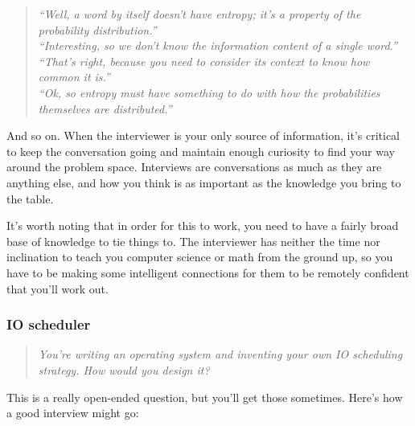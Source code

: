 \documentclass{article}
\begin{document}
\begin{quote}
\em
``Well, a word by itself doesn't have entropy; it's a property of the
  probability distribution.'' \\
``Interesting, so we don't know the information content of a single
  word.'' \\
``That's right, because you need to consider its context to know how
  common it is.'' \\
``Ok, so entropy must have something to do with how the probabilities
  themselves are distributed.''
\end{quote}

    And so on. When the interviewer is your only source of information, it's
    critical to keep the conversation going and maintain enough curiosity to
    find your way around the problem space. Interviews are conversations as
    much as they are anything else, and how you think is as important as the
    knowledge you bring to the table.

    It's worth noting that in order for this to work, you need to have a fairly
    broad base of knowledge to tie things to. The interviewer has neither the
    time nor inclination to teach you computer science or math from the ground
    up, so you have to be making some intelligent connections for them to be
    remotely confident that you'll work out.

\subsubsection{IO scheduler}
\begin{quote}
\em
You're writing an operating system and inventing your own IO scheduling
strategy. How would you design it?
\end{quote}

      This is a really open-ended question, but you'll get those sometimes.
      Here's how a good interview might go:
\end{document}
